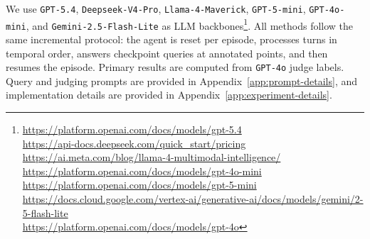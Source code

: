 \documentclass{llmxive}
\begin{document}
We use \texttt{GPT-5.4}, \texttt{Deepseek-V4-Pro}, \texttt{Llama-4-Maverick}, \texttt{GPT-5-mini}, \texttt{GPT-4o-mini}, and \texttt{Gemini-2.5-Flash-Lite} as LLM backbones\footnote{\scriptsize
\parbox[t]{\columnwidth}{
\url{https://platform.openai.com/docs/models/gpt-5.4}\\
\url{https://api-docs.deepseek.com/quick_start/pricing}\\
\url{https://ai.meta.com/blog/llama-4-multimodal-intelligence/}\\
\url{https://platform.openai.com/docs/models/gpt-4o-mini}\\
\url{https://platform.openai.com/docs/models/gpt-5-mini}\\
\url{https://docs.cloud.google.com/vertex-ai/generative-ai/docs/models/gemini/2-5-flash-lite}\\
\url{https://platform.openai.com/docs/models/gpt-4o}
}}. All methods follow the same incremental protocol: the agent is reset per episode, processes turns in temporal order, answers checkpoint queries at annotated points, and then resumes the episode. Primary results are computed from \texttt{GPT-4o} judge labels. Query and judging prompts are provided in Appendix~\ref{app:prompt-details}, and implementation details are provided in Appendix~\ref{app:experiment-details}.
\end{document}
